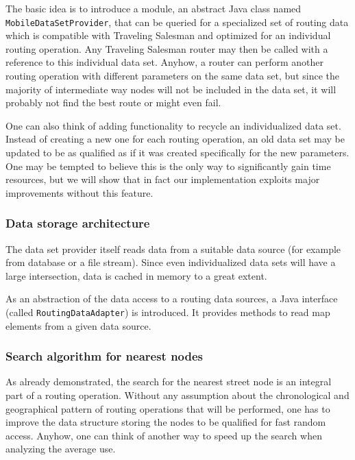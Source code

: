 The basic idea is to introduce a module, an abstract Java class named \texttt{MobileDataSetProvider}, that can be queried for a specialized set of routing data which is compatible with Traveling Salesman and optimized for an individual routing operation. Any Traveling Salesman router may then be called with a reference to this individual data set. Anyhow, a router can perform another routing operation with different parameters on the same data set, but since the majority of intermediate way nodes will not be included in the data set, it will probably not find the best route or might even fail.\newline

One can also think of adding functionality to recycle an individualized data set. Instead of creating a new one for each routing operation, an old data set may be updated to be as qualified as if it was created specifically for the new parameters. One may be tempted to believe this is the only way to significantly gain time resources, but we will show that in fact our implementation exploits major improvements without this feature.\newline

\subsubsection{Data storage architecture}

The data set provider itself reads data from a suitable data source (for example from database or a file stream). Since even individualized data sets will have a large intersection, data is cached in memory to a great extent.\newline

As an abstraction of the data access to a routing data sources, a Java interface (called \texttt{RoutingDataAdapter}) is introduced. It provides methods to read map elements from a given data source.\newline


\subsubsection{Search algorithm for nearest nodes}

As already demonstrated, the search for the nearest street node is an integral part of a routing operation. Without any assumption about the chronological and geographical pattern of routing operations that will be performed, one has to improve the data structure storing the nodes to be qualified for fast random access. Anyhow, one can think of another way to speed up the search when analyzing the average use.\newline

